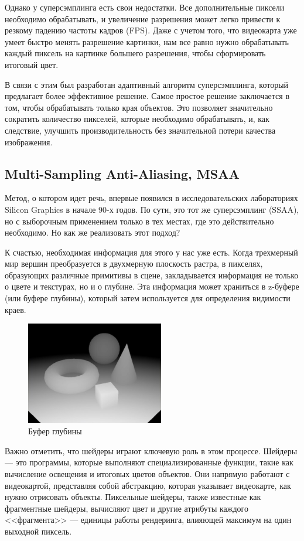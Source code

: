 Однако у суперсэмплинга есть свои недостатки. Все дополнительные пиксели необходимо обрабатывать, и увеличение разрешения может легко привести к резкому падению частоты кадров (FPS). Даже с учетом того, что видеокарта уже умеет быстро менять разрешение картинки, нам все равно нужно обрабатывать каждый пиксель на картинке большего разрешения, чтобы сформировать итоговый цвет.

В связи с этим был разработан адаптивный алгоритм суперсэмплинга, который предлагает более эффективное решение. Самое простое решение заключается в том, чтобы обрабатывать только края объектов. Это позволяет значительно сократить количество пикселей, которые необходимо обрабатывать, и, как следствие, улучшить производительность без значительной потери качества изображения.

\subsection{Multi-Sampling Anti-Aliasing, MSAA}
Метод, о котором идет речь, впервые появился в исследовательских лабораториях Silicon Graphics в начале 90-х годов. По сути, это тот же суперсэмплинг (SSAA), но с выборочным применением только в тех местах, где это действительно необходимо. Но как же реализовать этот подход?

К счастью, необходимая информация для этого у нас уже есть. Когда трехмерный мир вершин преобразуется в двухмерную плоскость растра, в пикселях, образующих различные примитивы в сцене, закладывается информация не только о цвете и текстурах, но и о глубине. Эта информация может храниться в z-буфере (или буфере глубины), который затем используется для определения видимости краев.

\begin{figure}[H]
    \centering
    \includegraphics[width = 6cm]{7.png}
    \caption{Буфер глубины}
    \label{fig:float}
\end{figure}

Важно отметить, что шейдеры играют ключевую роль в этом процессе. Шейдеры — это программы, которые выполняют специализированные функции, такие как вычисление освещения и итоговых цветов объектов. Они напрямую работают с видеокартой, представляя собой абстракцию, которая указывает видеокарте, как нужно отрисовать объекты. Пиксельные шейдеры, также известные как фрагментные шейдеры, вычисляют цвет и другие атрибуты каждого <<фрагмента>> — единицы работы рендеринга, влияющей максимум на один выходной пиксель.

